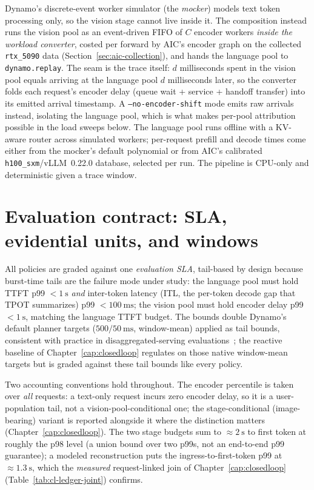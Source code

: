 Dynamo's discrete-event worker simulator (the \emph{mocker}) models text
token processing only, so the vision stage cannot live inside it. The
composition instead runs the vision pool as an event-driven FIFO of $C$
encoder workers \emph{inside the workload converter}, costed per forward by
AIC's encoder graph on the collected \texttt{rtx\_5090} data
(Section~\ref{sec:aic-collection}), and hands the language pool to
\texttt{dynamo.replay}. The seam is the trace itself: $d$ milliseconds spent
in the vision pool equals arriving at the language pool $d$ milliseconds
later, so the converter folds each request's encoder delay (queue wait +
service + handoff transfer) into its emitted arrival timestamp. A
\texttt{--no-encoder-shift} mode emits raw arrivals instead, isolating the
language pool, which is what makes per-pool attribution possible in the load
sweeps below. The language pool runs offline with a KV-aware router
across simulated workers; per-request prefill and decode times come either
from the mocker's default polynomial or from AIC's calibrated
\texttt{h100\_sxm}/vLLM~0.22.0 database, selected per run. The pipeline is
CPU-only and deterministic given a trace window.

\section{Evaluation contract: SLA, evidential units, and windows}
\label{sec:meth-contract}

All policies are graded against one \emph{evaluation SLA}, tail-based by
design because burst-time tails are the failure mode under study: the
language pool must hold TTFT p99 $<\SI{1}{\second}$ \emph{and} inter-token
latency (ITL, the per-token decode gap that TPOT summarizes) p99
$<\SI{100}{\milli\second}$; the vision pool must hold encoder delay p99
$<\SI{1}{\second}$, matching the language TTFT budget. The bounds double
Dynamo's default planner targets ($500/\SI{50}{\milli\second}$,
window-mean) applied as tail bounds, consistent with practice in
disaggregated-serving
evaluations~\cite{Zhong2024DistServe,Patke2025Chiron}; the reactive baseline
of Chapter~\ref{cap:closedloop} regulates on those native window-mean targets
but is graded against these tail bounds like every policy.

Two accounting conventions hold throughout. The encoder percentile is taken
over \emph{all} requests: a text-only request incurs zero encoder delay,
so it is a user-population tail, not a vision-pool-conditional one; the
stage-conditional (image-bearing) variant is reported alongside it where the
distinction matters (Chapter~\ref{cap:closedloop}). The two stage budgets
sum to ${\approx}\SI{2}{\second}$ to first token at roughly the p98 level
(a union bound over two p99s, not an end-to-end p99 guarantee); a modeled
reconstruction puts the ingress-to-first-token p99 at
${\approx}\SI{1.3}{\second}$, which the \emph{measured} request-linked join
of Chapter~\ref{cap:closedloop} (Table~\ref{tab:cl-ledger-joint}) confirms.

